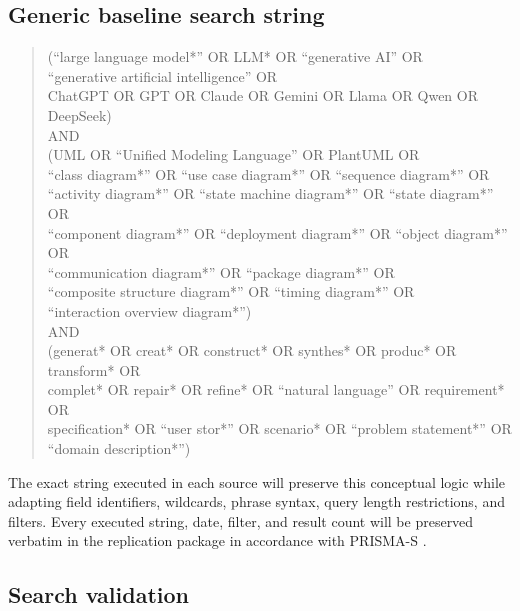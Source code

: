 \subsection{Generic baseline search string}

\begin{quote}
\begin{minipage}{0.94\textwidth}
\footnotesize\ttfamily\raggedright
(``large language model*'' OR LLM* OR ``generative AI'' OR\\
``generative artificial intelligence'' OR\\
ChatGPT OR GPT OR Claude OR Gemini OR Llama OR Qwen OR DeepSeek)\\[0.4em]
AND\\[0.4em]
(UML OR ``Unified Modeling Language'' OR PlantUML OR\\
``class diagram*'' OR ``use case diagram*'' OR ``sequence diagram*'' OR\\
``activity diagram*'' OR ``state machine diagram*'' OR ``state diagram*'' OR\\
``component diagram*'' OR ``deployment diagram*'' OR ``object diagram*'' OR\\
``communication diagram*'' OR ``package diagram*'' OR\\
``composite structure diagram*'' OR ``timing diagram*'' OR\\
``interaction overview diagram*'')\\[0.4em]
AND\\[0.4em]
(generat* OR creat* OR construct* OR synthes* OR produc* OR transform* OR\\
complet* OR repair* OR refine* OR ``natural language'' OR requirement* OR\\
specification* OR ``user stor*'' OR scenario* OR ``problem statement*'' OR\\
``domain description*'')
\end{minipage}
\end{quote}

The exact string executed in each source will preserve this conceptual logic while adapting field identifiers, wildcards, phrase syntax, query length restrictions, and filters. Every executed string, date, filter, and result count will be preserved verbatim in the replication package in accordance with PRISMA-S \cite{Rethlefsen2021PRISMAS}.


\subsection{Search validation}
\label{sec:protocol_search_validation}

